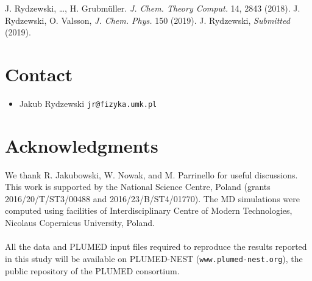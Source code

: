 \documentclass[a0,portrait]{a0poster}
\newcommand{\bi}{\item[\color{myblue}\ding{108}]}
\begin{document}
\begin{multicols}{2}
\color{myblue}
\begin{thebibliography}{6}%
\color{black}
 J. Rydzewski, \dots, H. Grubm\"{u}ller. \textit{J. Chem. Theory Comput.} 14, 2843 (2018).
 J. Rydzewski, O. Valsson, \textit{J. Chem. Phys.} 150 (2019).
 J. Rydzewski, \textit{Submitted} (2019).
\end{thebibliography}
\color{black}

\section*{\color{myblue} Contact}
\begin{itemize}
    \bi Jakub Rydzewski \texttt{jr@fizyka.umk.pl}
\end{itemize}

\section*{\color{myblue} Acknowledgments}
We thank R. Jakubowski, W. Nowak, and M. Parrinello for useful discussions.
This work is supported by the National Science Centre, Poland (grants
2016/20/T/ST3/00488 and 2016/23/B/ST4/01770). The MD simulations were computed
using facilities of Interdisciplinary Centre of Modern Technologies, Nicolaus
Copernicus University, Poland.
\\
\\
All the data and PLUMED input files required to reproduce the results reported in
this study will be available on PLUMED-NEST (\texttt{www.plumed-nest.org}), the public
repository of the PLUMED consortium. 

\end{multicols}
\end{document}
